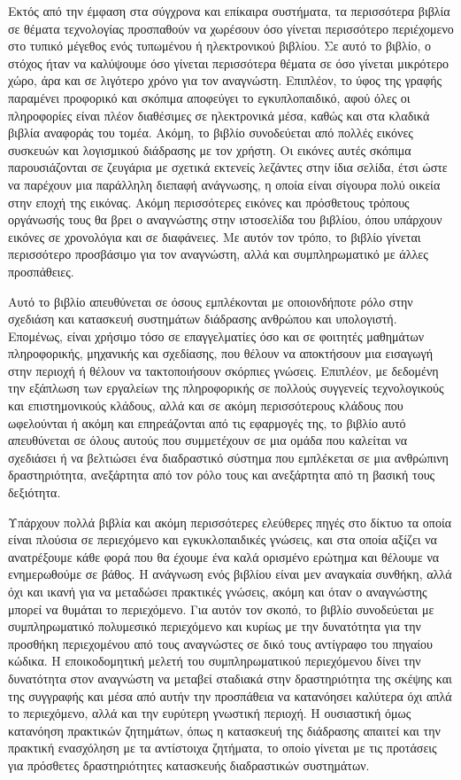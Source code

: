 \documentclass[
]{article}
\begin{document}
Εκτός από την έμφαση στα σύγχρονα και επίκαιρα συστήματα, τα περισσότερα
βιβλία σε θέματα τεχνολογίας προσπαθούν να χωρέσουν όσο γίνεται
περισσότερο περιέχομενο στο τυπικό μέγεθος ενός τυπωμένου ή ηλεκτρονικού
βιβλίου. Σε αυτό το βιβλίο, ο στόχος ήταν να καλύψουμε όσο γίνεται
περισσότερα θέματα σε όσο γίνεται μικρότερο χώρο, άρα και σε λιγότερο
χρόνο για τον αναγνώστη. Επιπλέον, το ύφος της γραφής παραμένει
προφορικό και σκόπιμα αποφεύγει το εγκυπλοπαιδικό, αφού όλες οι
πληροφορίες είναι πλέον διαθέσιμες σε ηλεκτρονικά μέσα, καθώς και στα
κλαδικά βιβλία αναφοράς του τομέα. Ακόμη, το βιβλίο συνοδεύεται από
πολλές εικόνες συσκευών και λογισμικού διάδρασης με τον χρήστη. Οι
εικόνες αυτές σκόπιμα παρουσιάζονται σε ζευγάρια με σχετικά εκτενείς
λεζάντες στην ίδια σελίδα, έτσι ώστε να παρέχουν μια παράλληλη διεπαφή
ανάγνωσης, η οποία είναι σίγουρα πολύ οικεία στην εποχή της εικόνας.
Ακόμη περισσότερες εικόνες και πρόσθετους τρόπους οργάνωσής τους θα βρει
ο αναγνώστης στην ιστοσελίδα του βιβλίου, όπου υπάρχουν εικόνες σε
χρονολόγια και σε διαφάνειες. Με αυτόν τον τρόπο, το βιβλίο γίνεται
περισσότερο προσβάσιμο για τον αναγνώστη, αλλά και συμπληρωματικό με
άλλες προσπάθειες.

Αυτό το βιβλίο απευθύνεται σε όσους εμπλέκονται με οποιονδήποτε ρόλο
στην σχεδιάση και κατασκευή συστημάτων διάδρασης ανθρώπου και
υπολογιστή. Επομένως, είναι χρήσιμο τόσο σε επαγγελματίες όσο και σε
φοιτητές μαθημάτων πληροφορικής, μηχανικής και σχεδίασης, που θέλουν να
αποκτήσουν μια εισαγωγή στην περιοχή ή θέλουν να τακτοποιήσουν σκόρπιες
γνώσεις. Επιπλέον, με δεδομένη την εξάπλωση των εργαλείων της
πληροφορικής σε πολλούς συγγενείς τεχνολογικούς και επιστημονικούς
κλάδους, αλλά και σε ακόμη περισσότερους κλάδους που ωφελούνται ή ακόμη
και επηρεάζονται από τις εφαρμογές της, το βιβλίο αυτό απευθύνεται σε
όλους αυτούς που συμμετέχουν σε μια ομάδα που καλείται να σχεδιάσει ή να
βελτιώσει ένα διαδραστικό σύστημα που εμπλέκεται σε μια ανθρώπινη
δραστηριότητα, ανεξάρτητα από τον ρόλο τους και ανεξάρτητα από τη βασική
τους δεξιότητα.

Υπάρχουν πολλά βιβλία και ακόμη περισσότερες ελεύθερες πηγές στο δίκτυο
τα οποία είναι πλούσια σε περιεχόμενο και εγκυκλοπαιδικές γνώσεις, και
στα οποία αξίζει να ανατρέξουμε κάθε φορά που θα έχουμε ένα καλά
ορισμένο ερώτημα και θέλουμε να ενημερωθούμε σε βάθος. Η ανάγνωση ενός
βιβλίου είναι μεν αναγκαία συνθήκη, αλλά όχι και ικανή για να μεταδώσει
πρακτικές γνώσεις, ακόμη και όταν ο αναγνώστης μπορεί να θυμάται το
περιεχόμενο. Για αυτόν τον σκοπό, το βιβλίο συνοδεύεται με
συμπληρωματικό πολυμεσικό περιεχόμενο και κυρίως με την δυνατότητα για
την προσθήκη περιεχομένου από τους αναγνώστες σε δικό τους αντίγραφο του
πηγαίου κώδικα. Η εποικοδομητική μελετή του συμπληρωματικού περιεχόμενου
δίνει την δυνατότητα στον αναγνώστη να μεταβεί σταδιακά στην
δραστηριότητα της σκέψης και της συγγραφής και μέσα από αυτήν την
προσπάθεια να κατανόησει καλύτερα όχι απλά το περιεχόμενο, αλλά και την
ευρύτερη γνωστική περιοχή. Η ουσιαστική όμως κατανόηση πρακτικών
ζητημάτων, όπως η κατασκευή της διάδρασης απαιτεί και την πρακτική
ενασχόληση με τα αντίστοιχα ζητήματα, το οποίο γίνεται με τις προτάσεις
για πρόσθετες δραστηριότητες κατασκευής διαδραστικών συστημάτων.
\end{document}
